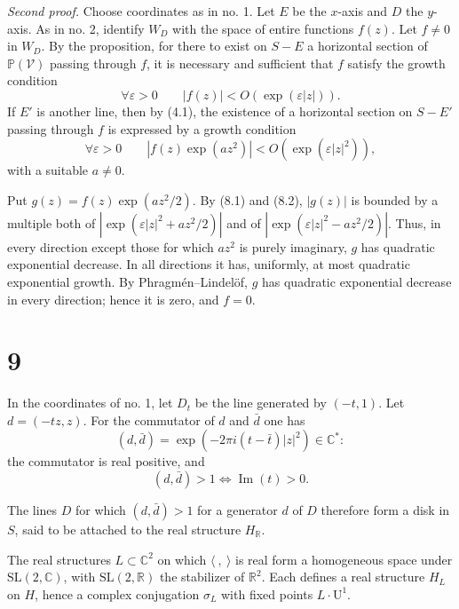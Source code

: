 \documentclass[12pt,a4paper]{article}
\theoremstyle{plain}
\theoremstyle{definition}
\theoremstyle{remark}
\DeclareMathOperator{\Impart}{Im}
\begin{document}
\medskip
\noindent\textit{Second proof.} Choose coordinates as in no. 1. Let $E$ be the $x$-axis and $D$ the $y$-axis. As in no. 2, identify $W_D$ with the space of entire functions $f(z)$. Let $f\neq 0$ in $W_D$. By the proposition, for there to exist on $S-E$ a horizontal section of $\mathbb P(\mathscr V)$ passing through $f$, it is necessary and sufficient that $f$ satisfy the growth condition
\begin{equation}\label{eq:8.1}
\forall \varepsilon>0\qquad |f(z)|<O(\exp(\varepsilon |z|)).\tag{8.1}
\end{equation}
If $E'$ is another line, then by (4.1), the existence of a horizontal section on $S-E'$ passing through $f$ is expressed by a growth condition
\begin{equation}\label{eq:8.2}
\forall \varepsilon>0\qquad |f(z)\exp(az^2)|<O(\exp(\varepsilon |z|^2)),\tag{8.2}
\end{equation}
with a suitable $a\neq 0$.

Put $g(z)=f(z)\exp(az^2/2)$. By (8.1) and (8.2), $|g(z)|$ is bounded by a multiple both of $|\exp(\varepsilon |z|^2+az^2/2)|$ and of $|\exp(\varepsilon |z|^2-az^2/2)|$. Thus, in every direction except those for which $az^2$ is purely imaginary, $g$ has quadratic exponential decrease. In all directions it has, uniformly, at most quadratic exponential growth. By Phragmén--Lindelöf, $g$ has quadratic exponential decrease in every direction; hence it is zero, and $f=0$.

\section*{9}

In the coordinates of no. 1, let $D_t$ be the line generated by $(-t,1)$. Let $d=(-tz,z)$. For the commutator of $d$ and $\bar d$ one has
\[
(d,\bar d)=\exp(-2\pi i(t-\bar t)|z|^2)\in \mathbb C^*:
\]
the commutator is real positive, and
\[
(d,\bar d)>1\iff \Impart(t)>0.
\]

The lines $D$ for which $(d,\bar d)>1$ for a generator $d$ of $D$ therefore form a disk in $S$, said to be attached to the real structure $H_{\mathbb R}$.

The real structures $L\subset \mathbb C^2$ on which $\langle\ ,\ \rangle$ is real form a homogeneous space under $\mathrm{SL}(2,\mathbb C)$, with $\mathrm{SL}(2,\mathbb R)$ the stabilizer of $\mathbb R^2$. Each defines a real structure $H_L$ on $H$, hence a complex conjugation $\sigma_L$ with fixed points $L\cdot \mathrm U^1$.
\end{document}
